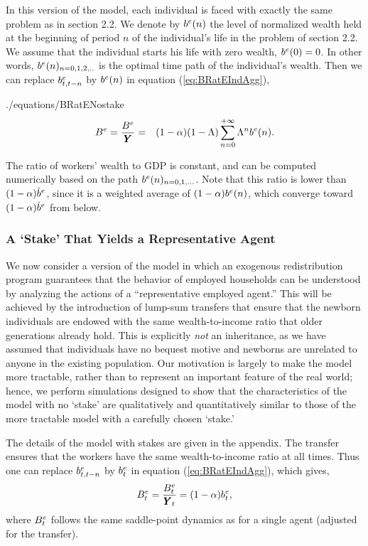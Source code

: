 \documentclass[titlepage,abstract,letterpaper]{econtex}
\renewcommand{\GDPLev}{\ensuremath{\pmb{Y}}}
\begin{document}
In this version of the model, each individual is faced with exactly
the same problem as in section 2.2. We denote by $b^{e}(n)$ the level
of normalized wealth held at the beginning of period $n$ of the
individual's life in the problem of section 2.2. We assume that the
individual starts his life with zero wealth, $b^{e}(0)=0$. In other
words, $b^{e}(n)_{n=0,1,2,..}$ is the optimal time path of the
individual's wealth. Then we can replace $b^{e}_{t,t-n}$ by
$b^{e}(n)$ in equation (\ref{eq:BRatEIndAgg}),
\begin{verbatimwrite}{./equations/BRatENostake}
\begin{eqnarray}
\BRatE = \frac{\BLevE}{\GDPLev} & = & (1-\kapShare) (1-\LGro)\sum_{n=0}^{+\infty}\LGro^{n} \bRatE(n).
\label{eq:BRatENostake}
\end{eqnarray}
\end{verbatimwrite}

The ratio of workers' wealth to GDP is constant, and can be computed numerically based on the path $b^{e}(n)_{n=0,1,...}$. Note that this ratio is lower than $(1-\alpha) \check{b}^{e}$, since it is a weighted average of $(1-\alpha) b^{e}(n)$, which converge toward $(1-\alpha) \check{b}^{e}$ from below.



\subsubsection{A `Stake' That Yields a Representative Agent}

We now consider a version of the model in which an exogenous
redistribution program guarantees that the behavior of employed
households can be understood by analyzing the actions of a
``representative employed agent.'' This will be achieved by the
introduction of lump-sum transfers that ensure that the newborn
individuals are endowed with the same wealth-to-income ratio that
older generations already hold. This is explicitly {\it not} an
inheritance, as we have assumed that individuals have no bequest
motive and newborns are unrelated to anyone in the existing
population.  Our motivation is largely to make the model more
tractable, rather than to represent an important feature of the real
world; hence, we perform simulations designed to show that the
characteristics of the model with no `stake' are qualitatively and
quantitatively similar to those of the more tractable model with a
carefully chosen `stake.'


The details of the model with stakes are given in the appendix. The transfer ensures that the workers have the same wealth-to-income ratio at all times. Thus one can replace $b^{e}_{t,t-n}$ by $b^{e}_t$ in equation (\ref{eq:BRatEIndAgg}), which gives,
\begin{equation}
\BRatE_{t} = \frac{\BLevE_t}{\GDPLev_t}= (1-\kapShare ) \bRatE_t,
\label{eq:BRatEStakest}
\end{equation}
where $B^{e}_t$ follows the same saddle-point dynamics as for a single agent (adjusted for the transfer).
\end{document}
